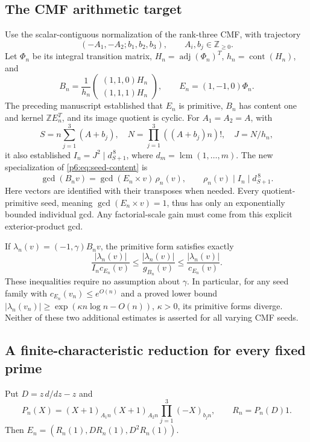 \documentclass[11pt,a4paper]{article}
\theoremstyle{definition}
\theoremstyle{remark}
\numberwithin{equation}{section}
\begin{document}
\subsection{The CMF arithmetic target}
Use the scalar-contiguous normalization of the rank-three CMF, with trajectory
\[(-A_1,-A_2;b_1,b_2,b_3),\qquad A_i,b_j\in\mathbb Z_{\ge0}.\] Let $\Phi_n$ be its integral transition matrix,
$H_n=\operatorname{adj}(\Phi_n)^T$, $h_n=\operatorname{cont}(H_n)$, and
\[
 B_n=\frac1{h_n}
 \begin{pmatrix}(1,1,0)H_n\\(1,1,1)H_n\end{pmatrix},
 \qquad E_n=(1,-1,0)\Phi_n.
\]
The preceding manuscript established that $E_n$ is primitive, $B_n$ has
content one and kernel $\mathbb ZE_n^T$, and its image quotient is cyclic.
For $A_1=A_2=A$, with
\[
 S=n\sum_{j=1}^3(A+b_j),\quad
 N=\prod_{j=1}^3((A+b_j)n)!,\quad J=N/h_n,
\]
it also established $I_n=J^2\mid d_{S+1}^{\,8}$, where
$d_m=\operatorname{lcm}(1,\ldots,m)$.
The new specialization of \eqref{p6:eq:seed-content} is
\begin{equation}\label{p6:eq:cmf-individual}
 \gcd(B_nv)=\gcd(E_n\times v)\,\rho_n(v),
 \qquad \rho_n(v)\mid I_n\mid d_{S+1}^{\,8}.
\end{equation}
Here vectors are identified with their transposes when needed.
Every quotient-primitive seed, meaning $\gcd(E_n\times v)=1$, thus has
only an exponentially bounded individual gcd. Any factorial-scale gain
must come from this explicit exterior-product gcd.

If $\lambda_n(v)=(-1,\gamma)B_nv$, the primitive form satisfies exactly
\[
 \frac{|\lambda_n(v)|}{I_nc_{E_n}(v)}
 \le \frac{|\lambda_n(v)|}{g_{B_n}(v)}
 \le \frac{|\lambda_n(v)|}{c_{E_n}(v)}.
\]
These inequalities require no assumption about $\gamma$. In particular,
for any seed family with $c_{E_n}(v_n)\le e^{O(n)}$ and a proved lower bound
$|\lambda_n(v_n)|\ge\exp(\kappa n\log n-O(n))$, $\kappa>0$, its primitive
forms diverge. Neither of these two additional estimates is asserted for
all varying CMF seeds.

\subsection{A finite-characteristic reduction for every fixed prime}
Put $D=z\,d/dz-z$ and
\[
 P_n(X)=(X+1)_{A_1n}(X+1)_{A_2n}
             \prod_{j=1}^3(-X)_{b_jn},\qquad R_n=P_n(D)1.
\]
Then $E_n=(R_n(1),DR_n(1),D^2R_n(1))$.
\end{document}
